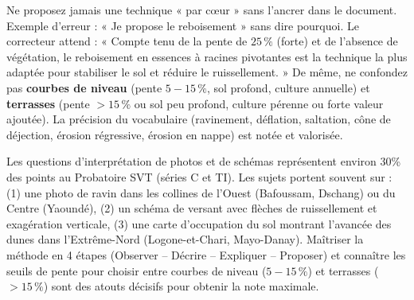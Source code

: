 \documentclass[11pt]{article}
\newcommand{\cle}[1]{{\popxbold\color{popdark}#1}}
\begin{document}
\begin{attention}
Ne proposez jamais une technique « par cœur » sans l'ancrer dans le document. Exemple d'erreur : « Je propose le reboisement » sans dire pourquoi. Le correcteur attend : « Compte tenu de la pente de $25\,\%$ (forte) et de l'absence de végétation, le reboisement en essences à racines pivotantes est la technique la plus adaptée pour stabiliser le sol et réduire le ruissellement. » De même, ne confondez pas \textbf{courbes de niveau} (pente $5-15\,\%$, sol profond, culture annuelle) et \textbf{terrasses} (pente $> 15\,\%$ ou sol peu profond, culture pérenne ou forte valeur ajoutée). La précision du vocabulaire (\cle{ravinement}, \cle{déflation}, \cle{saltation}, \cle{cône de déjection}, \cle{érosion régressive}, \cle{érosion en nappe}) est notée et valorisée.
\end{attention}

\begin{savaistu}[Le savais-tu ?]
Les questions d'interprétation de photos et de schémas représentent environ 30\% des points au Probatoire SVT (séries C et TI). Les sujets portent souvent sur : (1) une photo de ravin dans les collines de l'Ouest (Bafoussam, Dschang) ou du Centre (Yaoundé), (2) un schéma de versant avec flèches de ruissellement et exagération verticale, (3) une carte d'occupation du sol montrant l'avancée des dunes dans l'Extrême-Nord (Logone-et-Chari, Mayo-Danay). Maîtriser la méthode en 4 étapes (Observer – Décrire – Expliquer – Proposer) et connaître les seuils de pente pour choisir entre courbes de niveau ($5-15\,\%$) et terrasses ($> 15\,\%$) sont des atouts décisifs pour obtenir la note maximale.
\end{savaistu}
\end{document}
